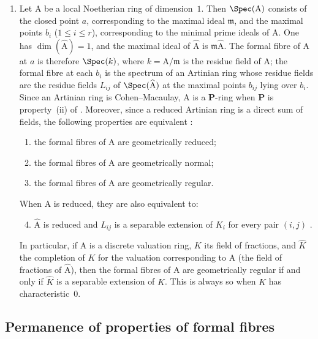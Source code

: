\begin{remarks}[7.3.19]
\begin{enumerate}[label=\emph{\roman*)}]
  \item Let $\mathrm{A}$ be a local Noetherian ring of dimension~$1$.
  Then $\Spec(\mathrm{A})$ consists of the closed point $a$, corresponding to the maximal ideal $\mathfrak{m}$, and the maximal points $b_i$ ($1\leqslant i\leqslant r$), corresponding to the minimal prime ideals of $\mathrm{A}$.
  One has $\dim(\widehat{\mathrm{A}})=1$, and the maximal ideal of $\widehat{\mathrm{A}}$ is $\mathfrak{m}\widehat{\mathrm{A}}$.
  The formal fibre of $\mathrm{A}$ at $a$ is therefore $\Spec(k)$, where $k=\mathrm{A}/\mathfrak{m}$ is the residue field of $\mathrm{A}$; the formal fibre at each $b_i$ is the spectrum of an Artinian ring whose residue fields are the residue fields $L_{ij}$ of $\Spec(\widehat{\mathrm{A}})$ at the maximal points $b_{ij}$ lying over $b_i$.
  Since an Artinian ring is Cohen--Macaulay, $\mathrm{A}$ is a $\boldsymbol{P}$-ring when $\boldsymbol{P}$ is property~(ii) of .
  Moreover, since a reduced Artinian ring is a direct sum of fields, the following properties are equivalent :
  \begin{enumerate}[label=\emph{\alph*)}]
    \item the formal fibres of $\mathrm{A}$ are geometrically reduced;
    \item the formal fibres of $\mathrm{A}$ are geometrically normal;
    \item the formal fibres of $\mathrm{A}$ are geometrically regular.
  \end{enumerate}
  When $\mathrm{A}$ is reduced, they are also equivalent to:
  \begin{enumerate}[label=\emph{\alph*)}]
    \setcounter{enumii}{3}
    \item $\widehat{\mathrm{A}}$ is reduced and $L_{ij}$ is a separable extension of $K_i$ for every pair $(i,j)$ .
  \end{enumerate}
  In particular, if $\mathrm{A}$ is a discrete valuation ring, $K$ its field of fractions, and $\widehat{K}$ the completion of $K$ for the valuation corresponding to $\mathrm{A}$ (the field of fractions of $\widehat{\mathrm{A}}$), then the formal fibres of $\mathrm{A}$ are geometrically regular if and only if $\widehat{K}$ is a separable extension of $K$.
  This is always so when $K$ has characteristic~$0$.
\end{enumerate}
\end{remarks}


\newpage %
\subsection{Permanence of properties of formal fibres}
\label{subsection:IV.7.4}

